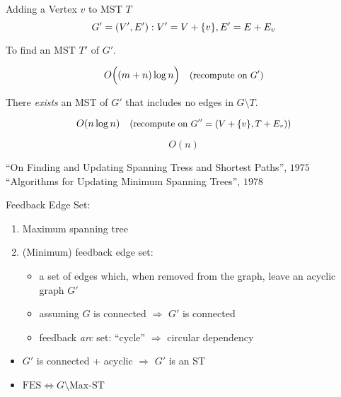 
\begin{frame}{}
  \begin{exampleblock}{Adding a Vertex $v$ to MST $T$ }
    \[
      G' = (V',E'): V' = V + \{v\}, E' = E + E_v
    \]

    \centerline{To find an MST $T'$ of $G'$.}
  \end{exampleblock}

  \[
    O\Big((m+n) \log n\Big) \quad \text{\small (recompute on $G'$)}
  \]

  \pause
  \begin{theorem}
    \centerline{There \emph{exists} an MST of $G'$ that includes no edges in $G \setminus T$.}
  \end{theorem}
  \pause
  \[
    O(n \log n) \quad \text{\small (recompute on $G'' = (V + \{v\}, T + E_v)$)}
  \]


  \pause
  \[
    O(n)
  \]

  \pause
  \vspace{-0.30cm}
  \begin{center}
    ``On Finding and Updating Spanning Tress and Shortest Paths'', $1975$ \\
    ``Algorithms for Updating Minimum Spanning Trees'', $1978$
  \end{center}
\end{frame}

\begin{frame}{}
  \begin{exampleblock}{Feedback Edge Set: }
    \begin{enumerate}
      \item Maximum spanning tree
      \item (Minimum) feedback edge set:
	\begin{itemize}
	  \item a set of edges which, when removed from the graph, leave an acyclic graph $G'$
	  \item assuming $G$ is connected $\Rightarrow$ $G'$ is connected
	  \item feedback \emph{arc} set: ``cycle'' $\Rightarrow$ circular dependency
	\end{itemize}
    \end{enumerate}
  \end{exampleblock}

    \begin{itemize}
      \item $G'$ is connected + acyclic $\Rightarrow$ $G'$ is an ST
      \item $\textrm{FES} \Leftrightarrow G \setminus \textrm{Max-ST}$
    \end{itemize}
\end{frame}

